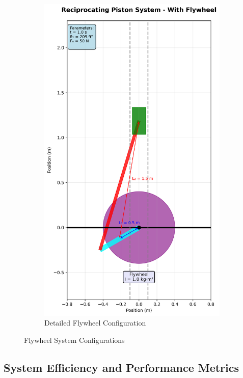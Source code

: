 \documentclass[10pt]{article}
\begin{document}
\begin{figure}[H]
\begin{subfigure}[b]{0.45\textwidth}
        \includegraphics[width=\textwidth]{system_with_flywheel.png}
        \caption{Detailed Flywheel Configuration}
    \end{subfigure}
    \caption{Flywheel System Configurations}
\end{figure}

\subsection{System Efficiency and Performance Metrics}
\end{document}
